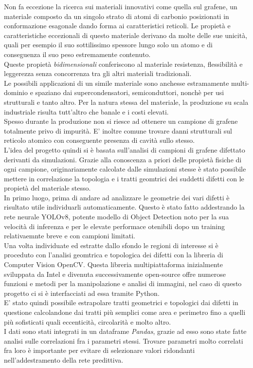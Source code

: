 \documentclass[12pt,a4paper,openright,twoside]{report}
\begin{document}
Non fa eccezione la ricerca sui materiali innovativi come quella sul grafene, un materiale composto da un singolo strato di atomi di carbonio posizionati in conformazione esagonale dando forma ai caratteristici reticoli.
Le propietà e caratteristiche eccezionali di questo materiale derivano da molte delle sue unicità, quali per esempio il suo sottilissimo spessore lungo solo un atomo e di conseguenza il suo peso estremamente contenuto. \\
Queste propietà \emph{bidimensionali} conferiscono al materiale resistenza, flessibilità e leggerezza senza concorrenza tra gli altri materiali tradizionali. \\
Le possibili applicazioni di un simile materiale sono anchesse estramamente multi-dominio e spaziano dai supercondensatori, semiconduttori, nonchè per usi strutturali e tanto altro. 
Per la natura stessa del materiale, la produzione su scala industriale risulta tutt'altro che banale e i costi elevati. \\
Spesso durante la produzione non si riesce ad ottenere un campione di grafene totalmente privo di impurità. E' inoltre comune trovare danni strutturali sul reticolo atomico con conseguente presenza di cavità sullo stesso. \\

L'idea del progetto quindi si è basata sull'analisi di campioni di grafene difettato derivanti da simulazioni. Grazie alla conoscenza a priori delle propietà fisiche di ogni campione, originariamente calcolate dalle simulazioni stesse è stato possibile mettere in correlazione la topologia e i tratti geomtrici dei suddetti difetti con le propietà del materiale stesso.\\
In primo luogo, prima di andare ad analizzare le geometrie dei vari difetti è risultato utile individuarli automaticamente. 
Questo è stato fatto addestrando la rete neurale YOLOv8, potente modello di Object Detection noto per la sua velocità di inferenza e per le elevate performace otenibili dopo un training relativaemnte breve e con campioni limitati.\\
Una volta individuate ed estratte dallo sfondo le regioni di interesse si è proceduto con l'analisi geomtrica e topologica dei difetti con la libreria di Computer Vision OpenCV.
Questa libreria multipiattaforma inizialmente sviluppata da Intel e divenuta successivamente open-source offre numerose funzioni e metodi per la manipolazione e analisi di immagini, nel caso di questo progetto ci si è interfacciati ad essa tramite Python. \\
E' stato quindi possibile estrapolare tratti geometrici e topologici dai difetti in questione calcolandone dai tratti più semplici come area e perimetro fino a quelli più sofisticati quali eccenticità, circolarità e molto altro.\\
I dati sono stati integrati in un dataframe \emph{Pandas}, grazie ad esso sono state fatte analisi sulle correlazioni fra i parametri stessi. Trovare parametri molto correlati fra loro è importante per evitare di selezionare valori ridondanti nell'addestramento della rete predittiva.\\
\end{document}

